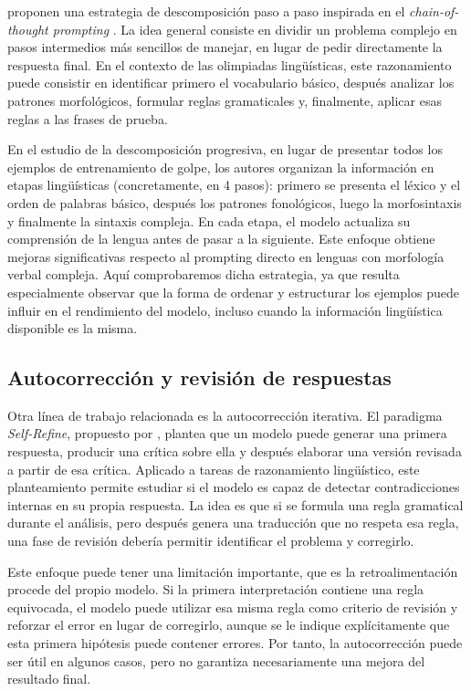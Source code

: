 \citet{zhu2025evaluating} proponen una estrategia de descomposición paso a paso inspirada en el \textit{chain-of-thought prompting} \citep{wei2022chain}. La idea general consiste en dividir un problema complejo en pasos intermedios más sencillos de manejar, en lugar de pedir directamente la respuesta final. En el contexto de las olimpiadas lingüísticas, este razonamiento puede consistir en identificar primero el vocabulario básico, después analizar los patrones morfológicos, formular reglas gramaticales y, finalmente, aplicar esas reglas a las frases de prueba.

En el estudio de la descomposición progresiva, en lugar de presentar todos los ejemplos de entrenamiento de golpe, los autores organizan la información en etapas lingüísticas (concretamente, en 4 pasos): primero se presenta el léxico y el orden de palabras básico, después los patrones fonológicos, luego la morfosintaxis y finalmente la sintaxis compleja. En cada etapa, el modelo actualiza su comprensión de la lengua antes de pasar a la siguiente. Este enfoque obtiene mejoras significativas respecto al prompting directo en lenguas con morfología verbal compleja. Aquí comprobaremos dicha estrategia, ya que resulta especialmente observar que la forma de ordenar y estructurar los ejemplos puede influir en el rendimiento del modelo, incluso cuando la información lingüística disponible es la misma.

\subsection{Autocorrección y revisión de respuestas}

Otra línea de trabajo relacionada es la autocorrección iterativa. El paradigma \textit{Self-Refine}, propuesto por \citet{madaan2023selfrefine}, plantea que un modelo puede generar una primera respuesta, producir una crítica sobre ella y después elaborar una versión revisada a partir de esa crítica. Aplicado a tareas de razonamiento lingüístico, este planteamiento permite estudiar si el modelo es capaz de detectar contradicciones internas en su propia respuesta. La idea es que si se formula una regla gramatical durante el análisis, pero después genera una traducción que no respeta esa regla, una fase de revisión debería permitir identificar el problema y corregirlo.

Este enfoque puede tener una limitación importante, que es la retroalimentación procede del propio modelo. Si la primera interpretación contiene una regla equivocada, el modelo puede utilizar esa misma regla como criterio de revisión y reforzar el error en lugar de corregirlo, aunque se le indique explícitamente que esta primera hipótesis puede contener errores. Por tanto, la autocorrección puede ser útil en algunos casos, pero no garantiza necesariamente una mejora del resultado final.

